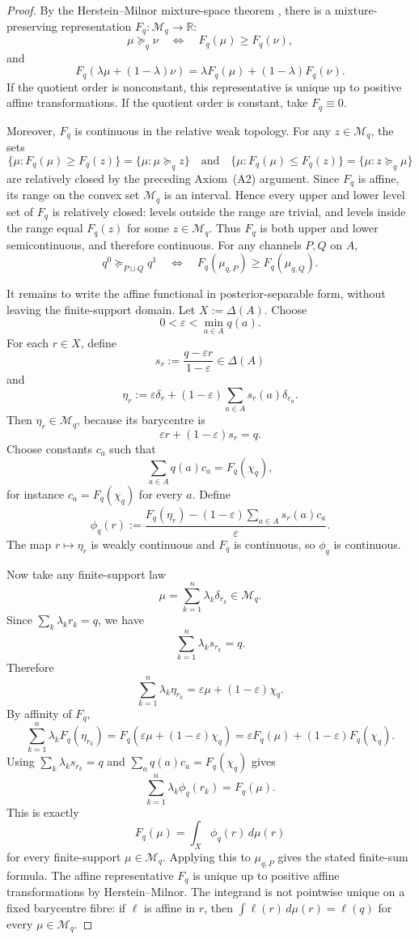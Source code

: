 \documentclass[11pt,a4paper]{article}
\theoremstyle{definition}
\newcommand{\R}{\mathbb R}
\newcommand{\1}{\mathbf 1}
\begin{document}
\begin{proof}
By the Herstein--Milnor mixture-space theorem \cite{HersteinMilnor1953}, there is a mixture-preserving representation
$F_q:\mathcal M_q\to\R$:
\[
\mu\succeq_q\nu
\quad\Longleftrightarrow\quad
F_q(\mu)\ge F_q(\nu),
\]
and
\[
F_q(\lambda\mu+(1-\lambda)\nu)
=
\lambda F_q(\mu)+(1-\lambda)F_q(\nu).
\]
If the quotient order is nonconstant, this representative is unique up to positive affine transformations.  If the
quotient order is constant, take $F_q\equiv0$.

Moreover, $F_q$ is continuous in the relative weak topology.  For any $z\in\mathcal M_q$, the sets
\[
\{\mu:F_q(\mu)\ge F_q(z)\}
=
\{\mu:\mu\succeq_q z\}
\quad\text{and}\quad
\{\mu:F_q(\mu)\le F_q(z)\}
=
\{\mu:z\succeq_q\mu\}
\]
are relatively closed by the preceding Axiom~\textup{(A2)} argument.  Since $F_q$ is affine, its range on the convex set
$\mathcal M_q$ is an interval.  Hence every upper and lower level set of $F_q$ is relatively closed: levels outside the
range are trivial, and levels inside the range equal $F_q(z)$ for some $z\in\mathcal M_q$.  Thus $F_q$ is both upper and
lower semicontinuous, and therefore continuous.  For any channels $P,Q$ on $A$,
\[
q^0\succeq_{P\sqcup Q}q^1
\quad\Longleftrightarrow\quad
F_q(\mu_{q,P})\ge F_q(\mu_{q,Q}).
\]

It remains to write the affine functional in posterior-separable form, without leaving the finite-support domain.  Let
$X:=\Delta(A)$.  Choose
\[
0<\varepsilon<\min_{a\in A}q(a).
\]
For each $r\in X$, define
\[
s_r:=\frac{q-\varepsilon r}{1-\varepsilon}\in\Delta(A)
\]
and
\[
\eta_r
:=
\varepsilon\delta_r+(1-\varepsilon)\sum_{a\in A}s_r(a)\delta_{e_a}.
\]
Then $\eta_r\in\mathcal M_q$, because its barycentre is
\[
\varepsilon r+(1-\varepsilon)s_r=q.
\]
Choose constants $c_a$ such that
\[
\sum_{a\in A}q(a)c_a=F_q(\chi_q),
\]
for instance $c_a=F_q(\chi_q)$ for every $a$.  Define
\[
\phi_q(r):=
\frac{
F_q(\eta_r)
-
(1-\varepsilon)\sum_{a\in A}s_r(a)c_a
}{\varepsilon}.
\]
The map $r\mapsto\eta_r$ is weakly continuous and $F_q$ is continuous, so $\phi_q$ is continuous.

Now take any finite-support law
\[
\mu=\sum_{k=1}^n\lambda_k\delta_{r_k}\in\mathcal M_q.
\]
Since $\sum_k\lambda_k r_k=q$, we have
\[
\sum_{k=1}^n\lambda_k s_{r_k}=q.
\]
Therefore
\[
\sum_{k=1}^n\lambda_k\eta_{r_k}
=
\varepsilon\mu+(1-\varepsilon)\chi_q.
\]
By affinity of $F_q$,
\[
\sum_{k=1}^n\lambda_k F_q(\eta_{r_k})
=
F_q\!\left(\varepsilon\mu+(1-\varepsilon)\chi_q\right)
=
\varepsilon F_q(\mu)+(1-\varepsilon)F_q(\chi_q).
\]
Using $\sum_k\lambda_k s_{r_k}=q$ and $\sum_a q(a)c_a=F_q(\chi_q)$ gives
\[
\sum_{k=1}^n\lambda_k\phi_q(r_k)=F_q(\mu).
\]
This is exactly
\[
F_q(\mu)=\int_X\phi_q(r)\,d\mu(r)
\]
for every finite-support $\mu\in\mathcal M_q$.  Applying this to $\mu_{q,P}$ gives the stated finite-sum formula.  The
affine representative $F_q$ is unique up to positive affine transformations by Herstein--Milnor.  The integrand is not
pointwise unique on a fixed barycentre fibre: if $\ell$ is affine in $r$, then $\int\ell(r)\,d\mu(r)=\ell(q)$ for every
$\mu\in\mathcal M_q$.
\end{proof}
\end{document}
